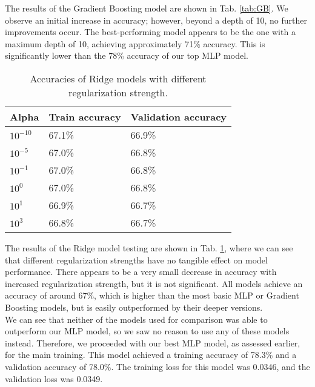 The results of the Gradient Boosting model are shown in Tab. \ref{tab:GB}. We observe an initial increase in accuracy; however, beyond a depth of 10, no further improvements occur. The best-performing model appears to be the one with a maximum depth of 10, achieving approximately 71\% accuracy. This is significantly lower than the 78\% accuracy of our top MLP model.
\\

\begin{table}[!h]
	\centering
	\begin{tabular}{|l|l|l|}
		\hline
		Alpha      & Train accuracy & Validation accuracy \\ \hline
		$10^{-10}$ & 67.1\%         & 66.9\%              \\ \hline
		$10^{-5}$  & 67.0\%         & 66.8\%              \\ \hline
		$10^{-1}$  & 67.0\%         & 66.8\%              \\ \hline
		$10^{0}$   & 67.0\%         & 66.8\%              \\ \hline
		$10^{1}$   & 66.9\%         & 66.7\%              \\ \hline
		$10^{3}$   & 66.8\%         & 66.7\%              \\ \hline
	\end{tabular}
	\caption{Accuracies of Ridge models with different regularization strength.}
	\label{tab:Ridge}
\end{table}

The results of the Ridge model testing are shown in Tab. \ref{tab:Ridge}, where we can see that different regularization strengths have no tangible effect on model performance. There appears to be a very small decrease in accuracy with increased regularization strength, but it is not significant. All models achieve an accuracy of around 67\%, which is higher than the most basic MLP or Gradient Boosting models, but is easily outperformed by their deeper versions.
\\

We can see that neither of the models used for comparison was able to outperform our MLP model, so we saw no reason to use any of these models instead. Therefore, we proceeded with our best MLP model, as assessed earlier, for the main training. This model achieved a training accuracy of 78.3\% and a validation accuracy of 78.0\%. The training loss for this model was 0.0346, and the validation loss was 0.0349.
